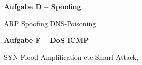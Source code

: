 \documentclass[paper=a4,fontsize=11pt]{scrartcl}%
\numberwithin{equation}{section}
\begin{document}
\begin{center}\Large{\textbf{Aufgabe D -- Spoofing}}\end{center}\vskip0.25in
ARP Spoofing
DNS-Poisoning

\begin{center}\Large{\textbf{Aufgabe F -- DoS ICMP}}\end{center}\vskip0.25in
SYN Flood
Amplification etc
Smurf Attack,
\end{document}

